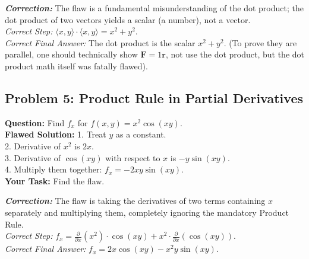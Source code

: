 \documentclass[11pt]{article}
\begin{document}
\vspace{0.2cm}
\noindent \textit{\textbf{Correction:}} The flaw is a fundamental misunderstanding of the dot product; the dot product of two vectors yields a scalar (a number), not a vector. \\
\textit{Correct Step:} $\langle x, y \rangle \cdot \langle x, y \rangle = x^2 + y^2$. \\
\textit{Correct Final Answer:} The dot product is the scalar $x^2 + y^2$. (To prove they are parallel, one should technically show $\mathbf{F} = 1\mathbf{r}$, not use the dot product, but the dot product math itself was fatally flawed).

\subsection*{Problem 5: Product Rule in Partial Derivatives}
\textbf{Question:} Find $f_x$ for $f(x,y) = x^2 \cos(xy)$. \\
\textbf{Flawed Solution:}
1. Treat $y$ as a constant. \\
2. Derivative of $x^2$ is $2x$. \\
3. Derivative of $\cos(xy)$ with respect to $x$ is $-y \sin(xy)$. \\
4. Multiply them together: $f_x = -2xy \sin(xy)$. \\
\textbf{Your Task:} Find the flaw.

\vspace{0.2cm}
\noindent \textit{\textbf{Correction:}} The flaw is taking the derivatives of two terms containing $x$ separately and multiplying them, completely ignoring the mandatory Product Rule. \\
\textit{Correct Step:} $f_x = \frac{\partial}{\partial x}(x^2) \cdot \cos(xy) + x^2 \cdot \frac{\partial}{\partial x}(\cos(xy))$. \\
\textit{Correct Final Answer:} $f_x = 2x \cos(xy) - x^2 y \sin(xy)$.
\end{document}
